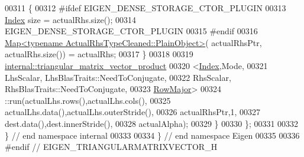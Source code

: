 \begin{DoxyCode}
00311     \{
00312 \textcolor{preprocessor}{      #ifdef EIGEN\_DENSE\_STORAGE\_CTOR\_PLUGIN}
00313       \hyperlink{namespace_eigen_a62e77e0933482dafde8fe197d9a2cfde}{Index} size = actualRhs.size();
00314       EIGEN\_DENSE\_STORAGE\_CTOR\_PLUGIN
00315 \textcolor{preprocessor}{      #endif}
00316       \hyperlink{group___core___module_class_eigen_1_1_map}{Map<typename ActualRhsTypeCleaned::PlainObject>}(
      actualRhsPtr, actualRhs.size()) = actualRhs;
00317     \}
00318 
00319     \hyperlink{struct_eigen_1_1internal_1_1triangular__matrix__vector__product}{internal::triangular\_matrix\_vector\_product}
00320       <\hyperlink{namespace_eigen_a62e77e0933482dafde8fe197d9a2cfde}{Index},Mode,
00321        LhsScalar, LhsBlasTraits::NeedToConjugate,
00322        RhsScalar, RhsBlasTraits::NeedToConjugate,
00323        \hyperlink{group__enums_ggaacded1a18ae58b0f554751f6cdf9eb13acfcde9cd8677c5f7caf6bd603666aae3}{RowMajor}>
00324       ::run(actualLhs.rows(),actualLhs.cols(),
00325             actualLhs.data(),actualLhs.outerStride(),
00326             actualRhsPtr,1,
00327             dest.data(),dest.innerStride(),
00328             actualAlpha);
00329   \}
00330 \};
00331 
00332 \} \textcolor{comment}{// end namespace internal}
00333 
00334 \} \textcolor{comment}{// end namespace Eigen}
00335 
00336 \textcolor{preprocessor}{#endif // EIGEN\_TRIANGULARMATRIXVECTOR\_H}
\end{DoxyCode}
